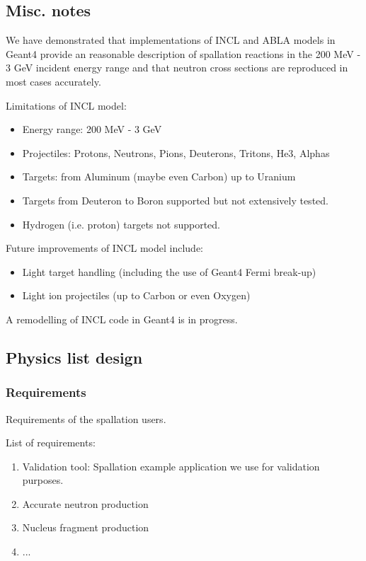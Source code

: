\begin{appendix}
\section{Misc. notes}
We have demonstrated that implementations of INCL and ABLA models in Geant4 provide
an reasonable description of spallation reactions in the 200 MeV - 3 GeV incident energy range 
and that neutron cross sections are reproduced in most cases accurately.



Limitations of INCL model:
\begin{itemize}
\item Energy range: 200 MeV - 3 GeV
\item Projectiles: Protons, Neutrons, Pions, Deuterons, Tritons, He3, Alphas
\item Targets: from Aluminum (maybe even Carbon) up to Uranium
\item Targets from Deuteron to Boron supported but not extensively tested.
\item Hydrogen (i.e. proton) targets not supported.
\end{itemize}

Future improvements of INCL model include:
\begin{itemize}
\item Light target handling (including the use of Geant4 Fermi break-up)
\item Light ion projectiles (up to Carbon or even Oxygen)
\end{itemize}


A remodelling of INCL code in Geant4 is in progress.  

\subsection{Physics list design}

\subsubsection{Requirements}
Requirements of the spallation users.

List of requirements:
\begin{enumerate}
\item Validation tool: Spallation example application we use for validation purposes.
\item Accurate neutron production
\item Nucleus fragment production
\item ...
\end{enumerate}


\end{appendix}
